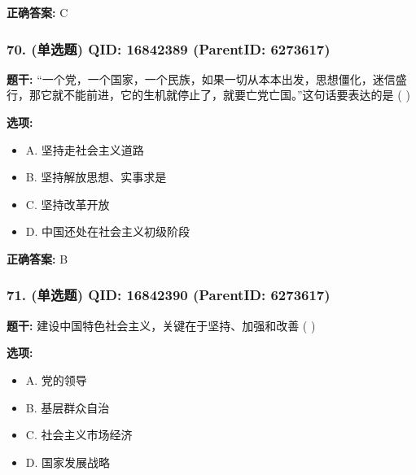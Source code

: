 \documentclass[12pt,UTF8]{ctexart}
\begin{document}
\textbf{正确答案:}
C

\vspace{0.3em}\hrulefill\vspace{0.7em}

\subsubsection*{70. (单选题) \small QID: 16842389 (ParentID: 6273617)}

\textbf{题干:}
“一个党，一个国家，一个民族，如果一切从本本出发，思想僵化，迷信盛行，那它就不能前进，它的生机就停止了，就要亡党亡国。”这句话要表达的是 ( )



\textbf{选项:}
\begin{itemize}[leftmargin=*]

  \item A. 坚持走社会主义道路

  \item B. 坚持解放思想、实事求是

  \item C. 坚持改革开放

  \item D. 中国还处在社会主义初级阶段

\end{itemize}

\textbf{正确答案:}
B

\vspace{0.3em}\hrulefill\vspace{0.7em}

\subsubsection*{71. (单选题) \small QID: 16842390 (ParentID: 6273617)}

\textbf{题干:}
建设中国特色社会主义，关键在于坚持、加强和改善 ( )



\textbf{选项:}
\begin{itemize}[leftmargin=*]

  \item A. 党的领导

  \item B. 基层群众自治

  \item C. 社会主义市场经济

  \item D. 国家发展战略

\end{itemize}
\end{document}
